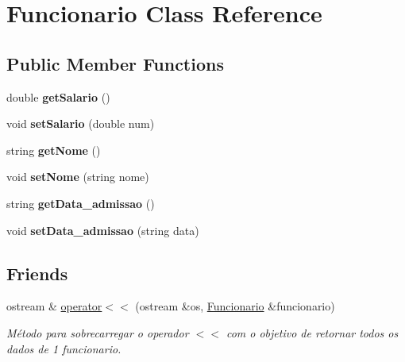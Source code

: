 \hypertarget{classFuncionario}{}\section{Funcionario Class Reference}
\label{classFuncionario}
\subsection*{Public Member Functions}
\begin{DoxyCompactItemize}
\item 
\mbox{\label{classFuncionario_a7b54fb52af8e80d631038e7a395fc9c6}} 
double {\bfseries get\+Salario} ()
\item 
\mbox{\label{classFuncionario_a502cb6f9a3e99a13be4f112484fa7143}} 
void {\bfseries set\+Salario} (double num)
\item 
\mbox{\label{classFuncionario_a13f42e2a8cb0515371b49745e5830c4c}} 
string {\bfseries get\+Nome} ()
\item 
\mbox{\label{classFuncionario_aa7876648c2ad5e3f4d3befcabcce0b1c}} 
void {\bfseries set\+Nome} (string nome)
\item 
\mbox{\label{classFuncionario_a500ff1a72e6ef139e2237e7ec6e63e46}} 
string {\bfseries get\+Data\+\_\+admissao} ()
\item 
\mbox{\label{classFuncionario_a77cfd25e08e9fc9d45a3065454b5ab95}} 
void {\bfseries set\+Data\+\_\+admissao} (string data)
\end{DoxyCompactItemize}
\subsection*{Friends}
\begin{DoxyCompactItemize}
\item 
ostream \& \hyperlink{classFuncionario_a915f81100b5fd32446de7308951b0fc3}{operator$<$$<$} (ostream \&os, \hyperlink{classFuncionario}{Funcionario} \&funcionario)
\begin{DoxyCompactList}\small\item\em Método para sobrecarregar o operador $<$$<$ com o objetivo de retornar todos os dados de 1 funcionario. \end{DoxyCompactList}\end{DoxyCompactItemize}


